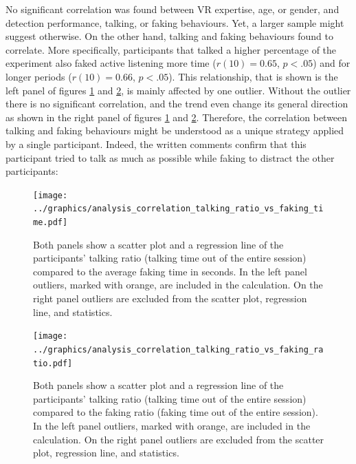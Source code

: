 \documentclass[]{simple-thesis}
\begin{document}
No significant correlation was found between VR expertise, age, or gender, and detection performance, talking, or faking behaviours.
Yet, a larger sample might suggest otherwise.
On the other hand, talking and faking behaviours found to correlate.
More specifically, participants that talked a higher percentage of the experiment also faked active listening more time ($r(10) = 0.65$, $p < .05$) and for longer periods ($r(10) = 0.66$, $p < .05$).
This relationship, that is shown is the left panel of figures \ref{fig:analysis:correlation_talking_ratio_vs_faking_time} and \ref{fig:analysis:correlation_talking_ratio_vs_faking_ratio}, is mainly affected by one outlier.
Without the outlier there is no significant correlation, and the trend even change its general direction as shown in the right panel of figures \ref{fig:analysis:correlation_talking_ratio_vs_faking_time} and \ref{fig:analysis:correlation_talking_ratio_vs_faking_ratio}.
Therefore, the correlation between talking and faking behaviours might be understood as a unique strategy applied by a single participant.
Indeed, the written comments confirm that this participant tried to talk as much as possible while faking to distract the other participants:

\begin{figure}
  \centering
  \texttt{[image: ../graphics/analysis\_correlation\_talking\_ratio\_vs\_faking\_time.pdf]}
  \caption{Both panels show a scatter plot and a regression line of the participants' talking ratio (talking time out of the entire session) compared to the average faking time in seconds. In the left panel outliers, marked with orange, are included in the calculation. On the right panel outliers are excluded from the scatter plot, regression line, and statistics.}
  \label{fig:analysis:correlation_talking_ratio_vs_faking_time}
\end{figure}

\begin{figure}
  \centering
  \texttt{[image: ../graphics/analysis\_correlation\_talking\_ratio\_vs\_faking\_ratio.pdf]}
  \caption{Both panels show a scatter plot and a regression line of the participants' talking ratio (talking time out of the entire session) compared to the faking ratio (faking time out of the entire session). In the left panel outliers, marked with orange, are included in the calculation. On the right panel outliers are excluded from the scatter plot, regression line, and statistics.}
  \label{fig:analysis:correlation_talking_ratio_vs_faking_ratio}
\end{figure}
\end{document}
